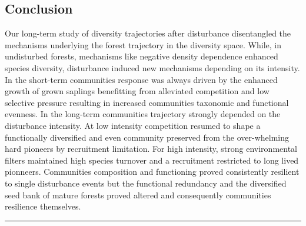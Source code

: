 \documentclass[fleqn,10pt]{ArtEcoFoG} %
\begin{document}
\subsection{Conclusion}\label{conclusion}

Our long-term study of diversity trajectories after disturbance
disentangled the mechanisms underlying the forest trajectory in the
diversity space. While, in undisturbed forests, mechanisms like negative
density dependence enhanced species diversity, disturbance induced new
mechanisms depending on its intensity. In the short-term communities
response was always driven by the enhanced growth of grown saplings
benefitting from alleviated competition and low selective pressure
resulting in increased communities taxonomic and functional evenness. In
the long-term communities trajectory strongly depended on the
disturbance intensity. At low intensity competition resumed to shape a
functionally diversified and even community preserved from the
over-whelming hard pioneers by recruitment limitation. For high
intensity, strong environmental filters maintained high species turnover
and a recruitment restricted to long lived pionneers. Communities
composition and functioning proved consistently resilient to single
disturbance events but the functional redundancy and the diversified
seed bank of mature forests proved altered and consequently communities
resilience themselves.

\begin{center}\rule{0.5\linewidth}{\linethickness}\end{center}





\end{document}

